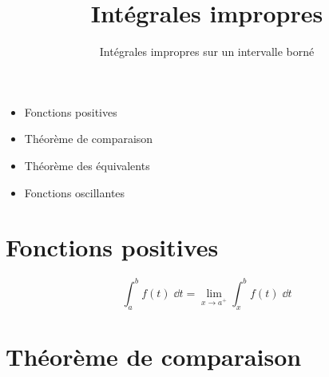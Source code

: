 







\title{{\bf Intégrales impropres}}
\subtitle{Intégrales impropres sur un intervalle borné}

\begin{frame}
  
  \debutmontitre

  \pause

{\footnotesize
\hfill
{}
\begin{minipage}{0.6\textwidth}
  \begin{itemize}
    \item<3-> Fonctions positives
    \item<4-> Théorème de comparaison
    \item<5-> Théorème des équivalents
    \item<6-> Fonctions oscillantes
      \end{itemize}
\end{minipage}
}

\end{frame}

\setcounter{framenumber}{0}

\section*{Fonctions positives}

\begin{frame}

	


\pause

$$\int_a^b f(t)\;\dd t = \lim_{x\rightarrow a^+} \int_x^b f(t)\;\dd t$$

\end{frame}



\section*{Théorème de comparaison}

